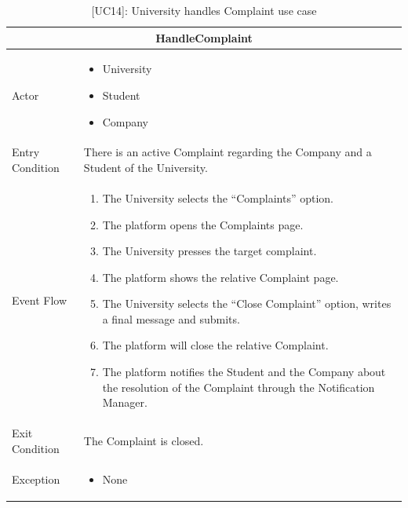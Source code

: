 \begin{table}[H]
    \centering
    \begin{tabular}{|p{3cm}|p{12cm}|}
    \hline
    \multicolumn{2}{|c|}{\textbf{HandleComplaint}} \\ \hline
    Actor & 
    \begin{itemize}
        \item University
        \item Student
        \item Company
    \end{itemize}\\ \hline
    Entry Condition & There is an active Complaint regarding the Company and a Student of the University.\\ \hline
    Event Flow &      
    \begin{enumerate}         
        \item The University selects the “Complaints” option.
        \item The platform opens the Complaints page.
        \item The University presses the target complaint.
        \item The platform shows the relative Complaint page.
        \item The University selects the “Close Complaint” option, writes a final message and submits.
        \item The platform will close the relative Complaint.
        \item The platform notifies the Student and the Company about the resolution of the Complaint through the Notification Manager.
    \end{enumerate} \\ \hline
    Exit Condition & The Complaint is closed.\\ \hline
    Exception & 
    \begin{itemize}         
        \item None
    \end{itemize} \\ \hline    
    \end{tabular}
    \caption{[UC14]: University handles Complaint use case}
    \label{tab:UC14}
\end{table}

